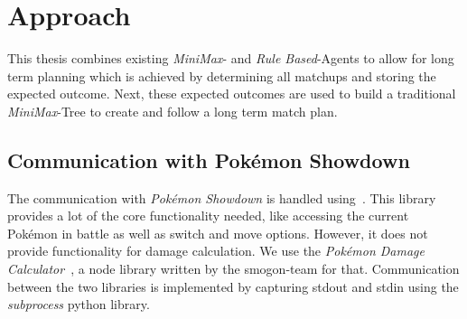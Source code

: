 
\chapter{Approach}
\label{ch:approach}
This thesis combines existing \textit{MiniMax}- and \textit{Rule Based}-Agents to allow for long term planning which is 
achieved by determining all matchups and storing the expected outcome. Next, these expected outcomes are used to
build a traditional \textit{MiniMax}-Tree to create and follow a long term match plan.
\section{Communication with Pokémon Showdown}
\label{sec:poke-env}
The communication with \textit{Pokémon Showdown} is handled using~\cite{PokeEnv:Github}.
This library provides a lot of the core functionality needed, like accessing the current Pokémon in battle as well
as switch and move options. However, it does not provide functionality for damage calculation. We use the \textit{Pokémon
Damage Calculator}~\autocite{Smogon:DamageCalc}, a node library written by the smogon-team for that. 
Communication between the two libraries is implemented by capturing stdout and stdin using the \textit{subprocess} python library.

